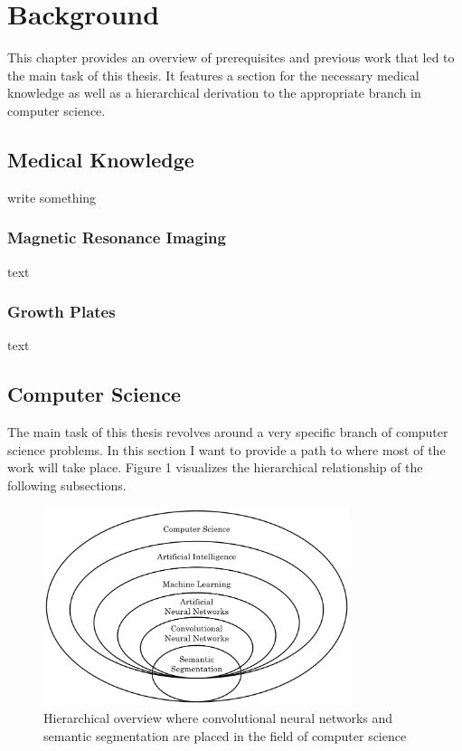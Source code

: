 \section{Background}

This chapter provides an overview of prerequisites and previous work that led to the main task of this thesis. It features a section for the necessary medical knowledge as well as a hierarchical derivation to the appropriate branch in computer science.

\subsection{Medical Knowledge}

write something

\subsubsection{Magnetic Resonance Imaging}

text

\subsubsection{Growth Plates}

text

\subsection{Computer Science}

The main task of this thesis revolves around a very specific branch of computer science problems. In this section I want to provide a path to where most of the work will take place. Figure 1 visualizes the hierarchical relationship of the following subsections.

\begin{figure}
\centering
\par
\includegraphics[width=0.8\textwidth]{imgs/cs_hier.png}
\caption{Hierarchical overview where convolutional neural networks and semantic segmentation are placed in the field of computer science}
\par
\end{figure}

